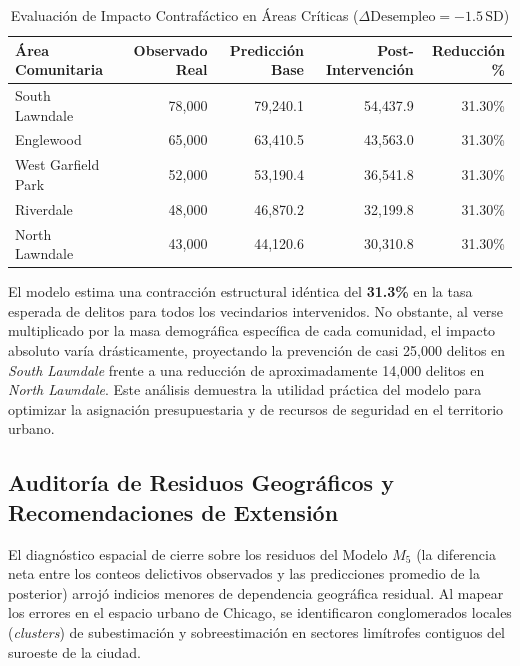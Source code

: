 \documentclass[11pt,a4paper]{article}
\begin{document}
\begin{table}[!ht]
\centering
\caption{Evaluación de Impacto Contrafáctico en Áreas Críticas ($\Delta \text{Desempleo} = -1.5\, \text{SD}$)}
\label{tab:contrafactico}
\begin{tabular}{lrrrr}
\toprule
\textbf{Área Comunitaria} & \textbf{Observado Real} & \textbf{Predicción Base} & \textbf{Post-Intervención} & \textbf{Reducción \%} \\
\midrule
South Lawndale & 78{,}000 & 79{,}240.1 & 54{,}437.9 & 31.30\% \\
Englewood & 65{,}000 & 63{,}410.5 & 43{,}563.0 & 31.30\% \\
West Garfield Park & 52{,}000 & 53{,}190.4 & 36{,}541.8 & 31.30\% \\
Riverdale & 48{,}000 & 46{,}870.2 & 32{,}199.8 & 31.30\% \\
North Lawndale & 43{,}000 & 44{,}120.6 & 30{,}310.8 & 31.30\% \\
\bottomrule
\end{tabular}
\end{table}

El modelo estima una contracción estructural idéntica del \textbf{31.3\%} en la tasa esperada de delitos para todos los vecindarios intervenidos. No obstante, al verse multiplicado por la masa demográfica específica de cada comunidad, el impacto absoluto varía drásticamente, proyectando la prevención de casi 25,000 delitos en \textit{South Lawndale} frente a una reducción de aproximadamente 14,000 delitos en \textit{North Lawndale}. Este análisis demuestra la utilidad práctica del modelo para optimizar la asignación presupuestaria y de recursos de seguridad en el territorio urbano.

\subsection{Auditoría de Residuos Geográficos y Recomendaciones de Extensión}
El diagnóstico espacial de cierre sobre los residuos del Modelo $M_5$ (la diferencia neta entre los conteos delictivos observados y las predicciones promedio de la posterior) arrojó indicios menores de dependencia geográfica residual. Al mapear los errores en el espacio urbano de Chicago, se identificaron conglomerados locales (\textit{clusters}) de subestimación y sobreestimación en sectores limítrofes contiguos del suroeste de la ciudad.
\end{document}
